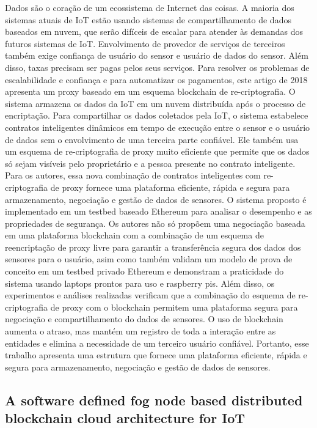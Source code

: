     Dados são o coração de um ecossistema de Internet das coisas. A maioria dos sistemas atuais de IoT estão usando sistemas de compartilhamento de dados baseados em nuvem, que serão difíceis de escalar para atender às demandas dos futuros sistemas de IoT. Envolvimento de provedor de serviços de terceiros também exige confiança de usuário do sensor e usuário de dados do sensor. Além disso, taxas precisam ser pagas pelos seus serviços. Para resolver os problemas de escalabilidade e confiança e para automatizar os pagamentos, este artigo de 2018 \cite{manzoor2018blockchain}   apresenta um proxy baseado em um esquema blockchain de re-criptografia. O sistema armazena os dados da IoT em um nuvem distribuída após o processo de encriptação. Para compartilhar os dados coletados pela IoT, o sistema estabelece contratos inteligentes dinâmicos em tempo de execução entre o sensor e o usuário de dados sem o envolvimento de uma terceira parte confiável. Ele também usa um esquema de re-criptografia de proxy muito eficiente que permite que os dados só sejam visíveis pelo proprietário e a pessoa presente no contrato inteligente. Para os autores, essa nova combinação de contratos inteligentes com re-criptografia de proxy fornece uma plataforma eficiente, rápida e segura para armazenamento, negociação e gestão de dados de sensores. O sistema proposto é implementado em um testbed baseado Ethereum para analisar o desempenho e as propriedades de segurança.
    Os autores não só propõem uma negociação baseada em uma plataforma blockchain com a combinação de um esquema de reencriptação de proxy livre para garantir a transferência segura dos dados dos sensores para o usuário, asim como também validam um modelo de prova de conceito em um testbed privado Ethereum e demonstram a praticidade do sistema usando laptops prontos para uso e raspberry pis. Além disso, os experimentos e análises realizadas verificam que a combinação do esquema de re-criptografia de proxy com o blockchain permitem uma plataforma segura para negociação e compartilhamento do dados de sensores. O uso de blockchain aumenta o atraso, mas mantém um registro de toda a interação entre as entidades e elimina a necessidade de um terceiro usuário confiável. Portanto, esse trabalho apresenta uma estrutura que fornece uma plataforma eficiente, rápida e segura para armazenamento, negociação e gestão de dados de sensores.

\subsection{A software defined fog node based distributed blockchain cloud architecture for IoT}

